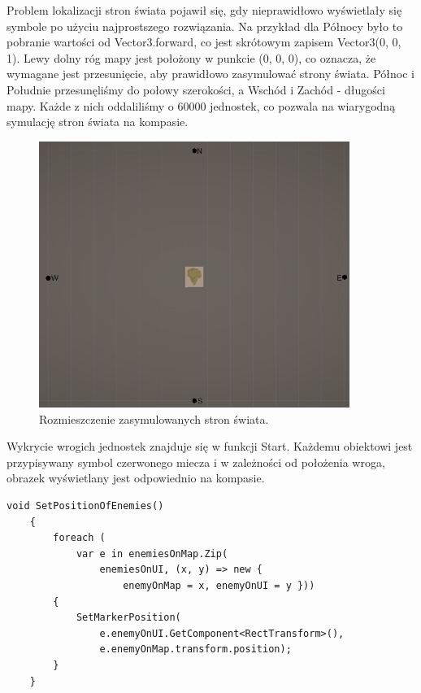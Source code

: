 Problem lokalizacji stron świata pojawił się, gdy nieprawidłowo wyświetlały się symbole po użyciu najprostszego rozwiązania. Na przykład dla Północy było to pobranie wartości od Vector3.forward, co jest skrótowym zapisem Vector3(0, 0, 1). Lewy dolny róg mapy jest położony w punkcie (0, 0, 0), co oznacza, że wymagane jest przesunięcie, aby prawidłowo zasymulować strony świata. Północ i Południe przesunęliśmy do połowy szerokości, a Wschód i Zachód - długości mapy. Każde z nich oddaliliśmy o 60000 jednostek, co pozwala na wiarygodną symulację stron świata na kompasie.
\begin{figure}[htbp]
    \centering
    \includegraphics[width=0.9\textwidth]{images/ui/strony_swiata.png}
    \caption{Rozmieszczenie zasymulowanych stron świata.}\label{fig:world_sides}
\end{figure}

Wykrycie wrogich jednostek znajduje się w funkcji Start. Każdemu obiektowi jest przypisywany symbol czerwonego miecza i w zależności od położenia wroga, obrazek wyświetlany jest odpowiednio na kompasie.
\begin{lstlisting}[caption=Fragment kodu odpowiedzialny za połączenie wrogich obiektów na mapie z symbolami wyświetlonymi na kompasie]
    void SetPositionOfEnemies()
    {
        foreach (
            var e in enemiesOnMap.Zip(
                enemiesOnUI, (x, y) => new { 
                    enemyOnMap = x, enemyOnUI = y }))
        {
            SetMarkerPosition(
                e.enemyOnUI.GetComponent<RectTransform>(),
                e.enemyOnMap.transform.position);
        }
    }
\end{lstlisting}
